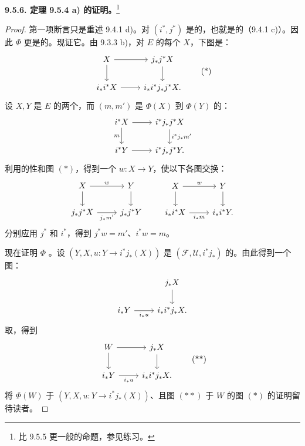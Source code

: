 \textbf{9.5.6. 定理 9.5.4 a) 的证明。}\footnote{比 9.5.5 更一般的命题，参见练习。}
\begin{proof}
第一项断言只是重述 9.4.1 d)。对 $(i^*,j^*)$ 是的，也就是的（9.4.1 c)）。因此 $\Phi$ 更是的。现证它。由 9.3.3 b)，对 $E$ 的每个 $X$，下图是：
\[
\begin{tikzcd}
X\arrow[r]\arrow[d]&j_*j^*X\arrow[d]\\
i_*i^*X\arrow[r]&i_*i^*j_*j^*X.
\end{tikzcd}\tag{*}
\]
设 $X,Y$ 是 $E$ 的两个，而 $(m,m')$ 是 $\Phi(X)$ 到 $\Phi(Y)$ 的：
\[
\begin{tikzcd}
i^*X\arrow[r]\arrow[d,"m"']&i^*j_*j^*X\arrow[d,"i^*j_*m'"]\\
i^*Y\arrow[r]&i^*j_*j^*Y.
\end{tikzcd}
\]
利用的性和图 $(*)$，得到一个 $w:X\to Y$，使以下各图交换：
\[
\begin{tikzcd}
X\arrow[r,"w"]\arrow[d]&Y\arrow[d]\\
j_*j^*X\arrow[r,"j_*m'"']&j_*j^*Y
\end{tikzcd}
\qquad
\begin{tikzcd}
X\arrow[r,"w"]\arrow[d]&Y\arrow[d]\\
i_*i^*X\arrow[r,"i_*m"']&i_*i^*Y.
\end{tikzcd}
\]
分别应用 $j^*$ 和 $i^*$，得到 $j^*w=m'$、$i^*w=m$。

现在证明 $\Phi$ 。设 $(Y,X,u:Y\to i^*j_*(X))$ 是 $(\mathscr F,\mathscr U,i^*j_*)$ 的。由此得到一个图：
\[
\begin{tikzcd}
&j_*X\arrow[d]\\
i_*Y\arrow[r,"i_*u"']&i_*i^*j_*X.
\end{tikzcd}
\]
取，得到
\[
\begin{tikzcd}
W\arrow[r]\arrow[d]&j_*X\arrow[d]\\
i_*Y\arrow[r,"i_*u"']&i_*i^*j_*X.
\end{tikzcd}\tag{**}
\]
将 $\Phi(W)$ 于 $(Y,X,u:Y\to i^*j_*(X))$、且图 $(**)$ 于 $W$ 的图 $(*)$ 的证明留待读者。
\end{proof}
